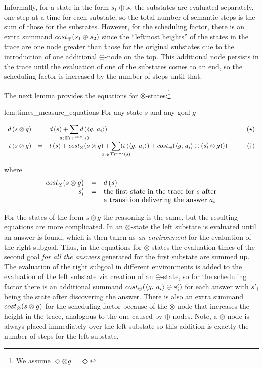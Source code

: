 Informally, for a state in the form $s_1 \oplus s_2$ the substates are evaluated separately, one step at a time for
each substate, so the total number of semantic steps is the sum of those for the substates. However, for the scheduling factor, 
there is an extra summand $cost_{\oplus}(s_1 \oplus s_2)$ since the ``leftmost heights'' of the states in the trace are one node greater than those for the
original substates due to the introduction of one additional $\oplus$-node on the top. This additional node persists in the trace until the evaluation
of one of the substates comes to an end, so the scheduling factor is increased by the number of steps until that.

The next lemma provides the equations for $\otimes$-states:\footnote{We assume $\Diamond\otimes g = \Diamond$}

\begin{replemma}{lem:times_measure_equations}
  For any state $s$ and any goal $g$
  
\[
\begin{array}{rclr}
d\,(s \otimes g)  &=&  d\,(s) + \smashoperator[lr]{\sum\limits_{a_i \in \tra{s}}} d\,(\taskst{g}{a_i})& \qquad(\star) \\

 t\,(s \otimes g)  &=&  t\,(s) + \costconj{s}{g} + \smashoperator[lr]{\sum\limits_{a_i \in \tra{s}}} (t\,(\taskst{g}{a_i}) + \costdisj{\taskst{g}{a_i}}{(s'_i \otimes g)})&\qquad(\dagger)
\end{array}
\]

where 
\[
\begin{array}{rcl}
cost_{\otimes}(s \otimes g) & = & d\,(s) \\
s'_i & = & \mbox{the first state in the trace for $s$ after} \\
 & & \mbox{a transition delivering the answer $a_i$} \\
\end{array}
\]
\end{replemma}

For the states of the form $s \otimes g$ the reasoning is the same, but the resulting equations are more complicated.
In an $\otimes$-state the left substate is evaluated until an answer is found, which is then taken as
\emph{an environment} for the evaluation of the right subgoal.
Thus, in the equations for $\otimes$-states the evaluation times of the second goal \emph{for all
the answers} generated for the first substate are summed up. The evaluation of the right subgoal
in different environments is added to the evaluation of the left substate via creation of
an $\oplus$-state, so for the scheduling factor there is
an additional summand $cost_{\oplus}(\langle g ,\, a_i \rangle \oplus s'_i)$ for each answer with $s'_i$ being the state
after discovering the answer.
There is also an extra summand $cost_{\otimes}(s \otimes g)$ for the scheduling factor because of the
$\otimes$-node that increases the height in the trace, analogous to the one caused by
$\oplus$-nodes.
Note, a $\otimes$-node is always placed immediately over the left substate so this
addition is exactly the number of steps for the left substate.

